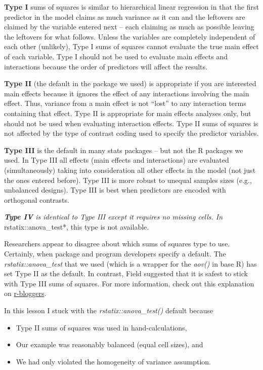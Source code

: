 \documentclass[
  11pt,
]{book}
\providecommand{\tightlist}{%
  \setlength{\itemsep}{0pt}\setlength{\parskip}{0pt}}
\begin{document}
\textbf{Type I} sums of squares is similar to hierarchical linear regression in that the first predictor in the model claims as much variance as it can and the leftovers are claimed by the variable entered next -- each claiming as much as possible leaving the leftovers for what follows. Unless the variables are completely independent of each other (unlikely), Type I sums of squares cannot evaluate the true main effect of each variable. Type I should not be used to evaluate main effects and interactions because the order of predictors will affect the results.

\textbf{Type II} (the default in the package we used) is appropriate if you are interested main effects because it ignores the effect of any interactions involving the main effect. Thus, variance from a main effect is not ``lost'' to any interaction terms containing that effect. Type II is appropriate for main effects analyses only, but should not be used when evaluating interaction effects. Type II sums of squares is not affected by the type of contrast coding used to specify the predictor variables.

\textbf{Type III} is the default in many stats packages -- but not the R packages we used. In Type III all effects (main effects and interactions) are evaluated (simultaneously) taking into consideration all other effects in the model (not just the ones entered before). Type III is more robust to unequal samples sizes (e.g., unbalanced designs). Type III is best when predictors are encoded with orthogonal contrasts.

\emph{\textbf{Type IV} is identical to Type III except it requires no missing cells. In }rstatix::anova\_test*, this type is not available.

Researchers appear to disagree about which sums of squares type to use. Certainly, when package and program developers specify a default. The \emph{rstatix::anova\_test} that we used (which is a wrapper for the \emph{aov()} in base R) has set Type II as the default. In contrast, Field \citeyearpar{field_discovering_2012} suggested that it is safest to stick with Type III sums of squares. For more information, check out this explanation on \href{https://www.r-bloggers.com/2011/03/anova-\%E2\%80\%93-type-iiiiii-ss-explained/}{r-bloggers}.

In this lesson I stuck with the \emph{rstatix::anova\_test()} default because

\begin{itemize}
\tightlist
\item
  Type II sums of squares was used in hand-calculations,
\item
  Our example was reasonably balanced (equal cell sizes), and
\item
  We had only violated the homogeneity of variance assumption.
\end{itemize}
\end{document}
